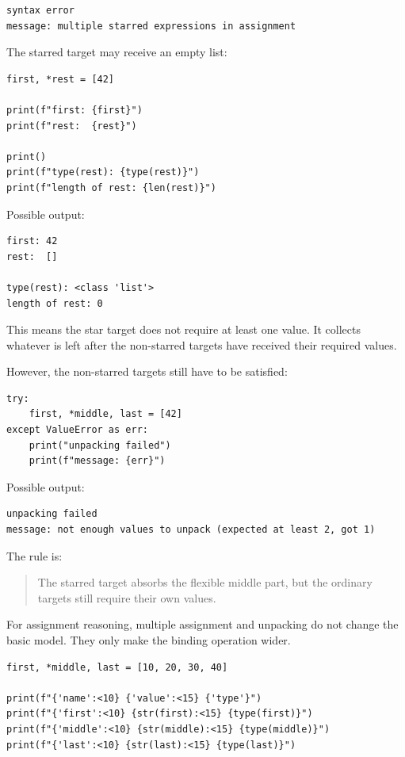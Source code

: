 \begin{verbatim}
syntax error
message: multiple starred expressions in assignment
\end{verbatim}

The starred target may receive an empty list:

\begin{verbatim}
first, *rest = [42]

print(f"first: {first}")
print(f"rest:  {rest}")

print()
print(f"type(rest): {type(rest)}")
print(f"length of rest: {len(rest)}")
\end{verbatim}

Possible output:

\begin{verbatim}
first: 42
rest:  []

type(rest): <class 'list'>
length of rest: 0
\end{verbatim}

This means the star target does not require at least one value. It collects whatever is left after the non-starred targets have received their required values.

However, the non-starred targets still have to be satisfied:

\begin{verbatim}
try:
    first, *middle, last = [42]
except ValueError as err:
    print("unpacking failed")
    print(f"message: {err}")
\end{verbatim}

Possible output:

\begin{verbatim}
unpacking failed
message: not enough values to unpack (expected at least 2, got 1)
\end{verbatim}

The rule is:

\begin{quote}
The starred target absorbs the flexible middle part, but the ordinary targets still require their own values.
\end{quote}

For assignment reasoning, multiple assignment and unpacking do not change the basic model. They only make the binding operation wider.

\begin{verbatim}
first, *middle, last = [10, 20, 30, 40]

print(f"{'name':<10} {'value':<15} {'type'}")
print(f"{'first':<10} {str(first):<15} {type(first)}")
print(f"{'middle':<10} {str(middle):<15} {type(middle)}")
print(f"{'last':<10} {str(last):<15} {type(last)}")
\end{verbatim}

